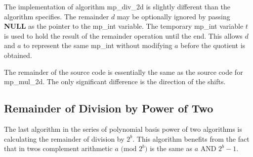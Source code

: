 \documentclass[b5paper]{book}
\begin{document}
The implementation of algorithm mp\_div\_2d is slightly different than the algorithm specifies.  The remainder $d$ may be optionally 
ignored by passing \textbf{NULL} as the pointer to the mp\_int variable.    The temporary mp\_int variable $t$ is used to hold the 
result of the remainder operation until the end.  This allows $d$ and $a$ to represent the same mp\_int without modifying $a$ before
the quotient is obtained.

The remainder of the source code is essentially the same as the source code for mp\_mul\_2d.  The only significant difference is
the direction of the shifts.

\subsection{Remainder of Division by Power of Two}

The last algorithm in the series of polynomial basis power of two algorithms is calculating the remainder of division by $2^b$.  This
algorithm benefits from the fact that in twos complement arithmetic $a \mbox{ (mod }2^b\mbox{)}$ is the same as $a$ AND $2^b - 1$.  
\end{document}
